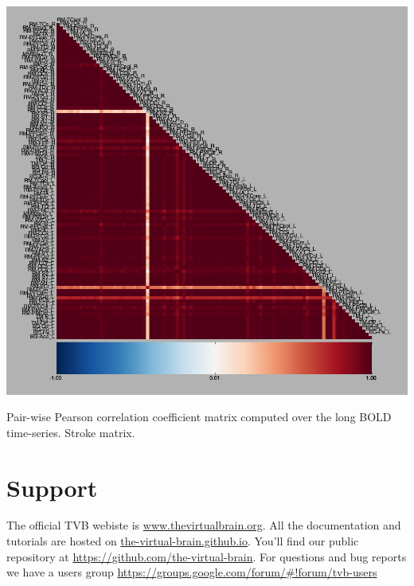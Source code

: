 \documentclass{tufte-handout}
\begin{document}
  \begin{marginfigure}
  \includegraphics[width=\linewidth]{Handout_UI_ModellingStructuralLesions_bold_pearson_g2d_stroke.png}	
  \caption{Pair-wise Pearson correlation coefficient matrix computed over the long BOLD time-series. Stroke matrix.}
  \label{fig:steps_sim_07}
\end{marginfigure}




\section{Support}\label{sec:support}

The official TVB webiste is \url{www.thevirtualbrain.org}.  
All the documentation and tutorials are hosted on \url{the-virtual-brain.github.io}.
You'll find our public  repository at \url{https://github.com/the-virtual-brain}. 
For questions and bug reports we have a users group \url{https://groups.google.com/forum/#!forum/tvb-users}



\end{document}
